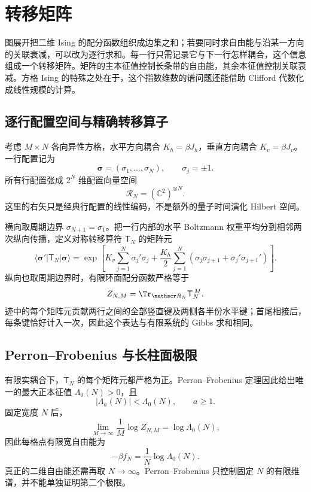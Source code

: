 \section{转移矩阵}
\label{chap:phys-sm-transfer-matrix-fermionization}

图展开把二维 Ising 的配分函数组织成边集之和；若要同时求自由能与沿某一方向的关联衰减，可以改为逐行求和。每一行只需记录它与下一行怎样耦合，这个信息组成一个转移矩阵。矩阵的主本征值控制长条带的自由能，其余本征值控制关联衰减。方格 Ising 的特殊之处在于，这个指数维数的谱问题还能借助 Clifford 代数化成线性规模的计算。
\subsection{逐行配置空间与精确转移算子}
\label{sec:phys-sm-transfer-matrix-foundations}

考虑 \(M\times N\) 各向异性方格，水平方向耦合 \(K_h=\beta J_h\)，垂直方向耦合 \(K_v=\beta J_v\)。一行配置记为
\[
 \boldsymbol\sigma=(\sigma_1,\ldots,\sigma_N),
 \qquad \sigma_j=\pm1.
\]
所有行配置张成 \(2^N\) 维配置向量空间
\begin{equation}
 \mathscr R_N=(\mathbb C^2)^{\otimes N}.
 \label{eq:phys-sm-row-space}
\end{equation}
这里的右矢只是经典行配置的线性编码，不是额外的量子时间演化 Hilbert 空间。

横向取周期边界 \(\sigma_{N+1}=\sigma_1\)。把一行内部的水平 Boltzmann 权重平均分到相邻两次纵向传播，定义对称转移算符 \(\mathsf T_N\) 的矩阵元
\begin{equation}
 \langle\boldsymbol\sigma'|\mathsf T_N|\boldsymbol\sigma\rangle
 =\exp\!\left[
 K_v\sum_{j=1}^{N}\sigma_j'\sigma_j
 +\frac{K_h}{2}\sum_{j=1}^{N}
 \left(\sigma_j\sigma_{j+1}
 +\sigma_j'\sigma_{j+1}'\right)
 \right].
 \label{eq:phys-sm-row-transfer-matrix}
\end{equation}
纵向也取周期边界时，有限环面配分函数严格等于
\begin{equation}
 Z_{N,M}=\Tr_{\mathscr R_N}\mathsf T_N^{\,M}.
 \label{eq:phys-sm-transfer-trace-general}
\end{equation}
迹中的每个矩阵元贡献两行之间的全部竖直键及两侧各半份水平键；首尾相接后，每条键恰好计入一次，因此这个表达与有限系统的 Gibbs 求和相同。

\subsection{Perron--Frobenius 与长柱面极限}

有限实耦合下，\(\mathsf T_N\) 的每个矩阵元都严格为正。Perron--Frobenius 定理因此给出唯一的最大正本征值 \(\Lambda_0(N)>0\)，且
\[
 |\Lambda_a(N)|<\Lambda_0(N),\qquad a\ge1.
\]
固定宽度 \(N\) 后，
\begin{equation}
 \lim_{M\to\infty}\frac1M\log Z_{N,M}
 =\log\Lambda_0(N),
 \label{eq:phys-sm-transfer-long-cylinder}
\end{equation}
因此每格点有限宽自由能为
\begin{equation}
 -\beta f_N=\frac1N\log\Lambda_0(N).
 \label{eq:phys-sm-strip-free-energy}
\end{equation}
真正的二维自由能还需再取 \(N\to\infty\)。Perron--Frobenius 只控制固定 \(N\) 的有限维谱，并不能单独证明第二个极限。

